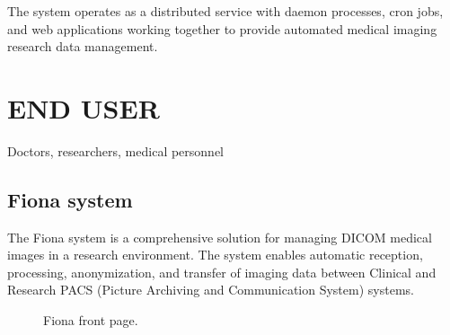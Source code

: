 \documentclass[letterpaper,10pt,english]{sphinxmanual}
\begin{document}
\sphinxAtStartPar
The system operates as a distributed service with daemon processes, cron jobs, and web applications
working together to provide automated medical imaging research data management.

\sphinxstepscope


\chapter{END USER}
\label{\detokenize{EndUser/index:end-user}}\label{\detokenize{EndUser/index::doc}}
\sphinxAtStartPar
{} Doctors, researchers, medical personnel


\section{Fiona system}
\label{\detokenize{EndUser/index:fiona-system}}
\sphinxAtStartPar
The Fiona system is a comprehensive solution for managing DICOM medical images in a research environment. The system enables automatic reception, processing, anonymization, and transfer of imaging data between Clinical and Research PACS (Picture Archiving and Communication System) systems.

\begin{figure}[htbp]
\centering
\capstart

\noindent{}
\caption{Fiona front page.}\label{\detokenize{EndUser/index:id1}}\end{figure}
\end{document}
